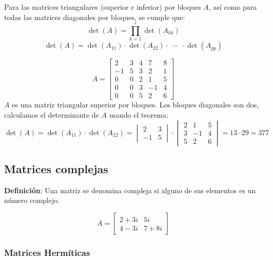 Para las matrices triangulares (superior e inferior) por bloques \(A\), así como para todas las matrices diagonales por bloques, se cumple que:
\[
  \det(A) = \prod_{k=1}^{r}\det(A_{kk})
\]
\[
\det(A) = \det(A_{11}) \cdot \det(A_{22}) \cdot ~~ \cdots ~~ \cdot \det(A_{pp})
\]

\[
A = \left[\begin{array}{cc|ccc}
  2 & 3 & 4 & 7 & 8 \\
  -1 & 5 & 3 & 2 & 1 \\
  \hline
  0 & 0 & 2 & 1 & 5 \\
  0 & 0 & 3 & -1 & 4 \\
  0 & 0 & 5 & 2 & 6 
\end{array}\right]
\]
\(A\) es una matriz triangular superior por bloques. Los bloques diagonales son dos, calculamos el determinante de \(A\) usando el teorema:
\[
\det(A) = \det(A_{11}) \cdot \det(A_{22}) = \begin{vmatrix}
  2 & 3 \\ 
  -1 & 5
\end{vmatrix} \cdot \begin{vmatrix}
  2 & 1 & 5 \\
  3 & -1 & 4 \\
  5 & 2 & 6
\end{vmatrix} = 13 \cdot 29 = 377
\]

\subsection{Matrices complejas}

\textbf{Definición}: Una matriz se denomina compleja si alguno de sus elementos es un número complejo.

\[
A = \begin{bmatrix}
  2+3i & 5i \\
  4-3i & 7+8i
\end{bmatrix}
\]

\subsubsection{Matrices Hermíticas}

